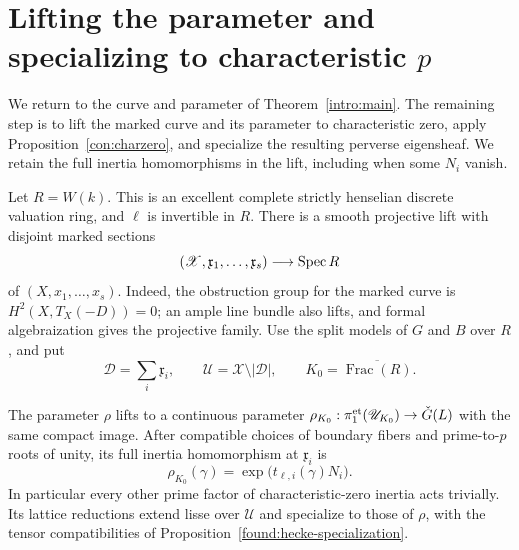 \section{Lifting the parameter and specializing to characteristic
\texorpdfstring{$p$}{p}}\label{lift:section}

We return to the curve and parameter of Theorem~\ref{intro:main}.
The remaining step is to lift the marked curve and its parameter to
characteristic zero, apply Proposition~\ref{con:charzero}, and
specialize the resulting perverse eigensheaf.  We retain the full
inertia homomorphisms in the lift, including when some $N_i$ vanish.

Let $R=W(k)$.  This is an excellent complete strictly henselian
discrete valuation ring, and $\ell$ is invertible in $R$.  There is
a smooth projective lift with disjoint marked sections
\[
 (\mathscr X,\mathfrak x_1,\ldots,\mathfrak x_s)
                         \longrightarrow\operatorname{Spec} R
\]
of $(X,x_1,\ldots,x_s)$.  Indeed, the obstruction group for the
marked curve is $H^2(X,T_X(-D))=0$; an ample line bundle also lifts,
and formal algebraization gives the projective family.  Use the
split models of $G$ and $B$ over $R$, and put
\[
 \mathscr D=\sum_i\mathfrak x_i,\qquad
 \mathscr U=\mathscr X\setminus|\mathscr D|,\qquad
 K_0=\overline{\operatorname{Frac}(R)}.
\]

\begin{lemma}\label{lift:parameter}
The parameter $\rho$ lifts to a continuous parameter
$\rho_{K_0}:\pi_1^{\mathrm{et}}(\mathscr U_{K_0})\to\check G(L)$ with the same
compact image.  After compatible choices of boundary fibers and
prime-to-$p$ roots of unity, its full inertia homomorphism at
$\mathfrak x_i$ is
\begin{equation}\label{lift:inertia}
 \rho_{K_0}(\gamma)=\exp\bigl(t_{\ell,i}(\gamma)N_i\bigr).
\end{equation}
In particular every other prime factor of characteristic-zero
inertia acts trivially.  Its lattice reductions extend lisse over
$\mathscr U$ and specialize to those of $\rho$, with the tensor
compatibilities of Proposition~\ref{found:hecke-specialization}.
\end{lemma}

